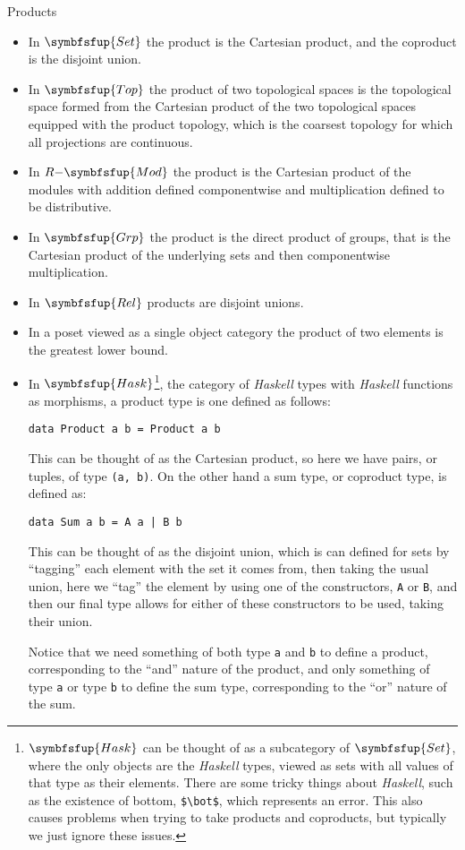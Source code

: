 \documentclass[fleqn]{NotesClass}
\makeatletter
\newcommand{\Haskell}{\textit{Haskell}}
\newcommand{\c@egory}[1]{\symbfsfup{#1}}
\newcommand{\Set}{\c@egory{Set}}
\newcommand{\Rel}{\c@egory{Rel}}
\newcommand{\Grp}{\c@egory{Grp}}
\newcommand{\RMod}[1][R]{#1{-}\c@egory{Mod}}
\newcommand{\Top}{\c@egory{Top}}
\newcommand{\Hask}{\c@egory{Hask}}
\makeatother
\begin{document}
    \begin{exm}{Products}{}
        \begin{itemize}
            \item In \(\Set\) the product is the Cartesian product, and the coproduct is the disjoint union.
            \item In \(\Top\) the product of two topological spaces is the topological space formed from the Cartesian product of the two topological spaces equipped with the product topology, which is the coarsest topology for which all projections are continuous.
            \item In \(\RMod\) the product is the Cartesian product of the modules with addition defined componentwise and multiplication defined to be distributive.
            \item In \(\Grp\) the product is the direct product of groups, that is the Cartesian product of the underlying sets and then componentwise multiplication.
            \item In \(\Rel\) products are disjoint unions.
            \item In a poset viewed as a single object category the product of two elements is the greatest lower bound.
            \item In \(\Hask\)\footnote{\(\Hask\) can be thought of as a subcategory of \(\Set\), where the only objects are the \Haskell{} types, viewed as sets with all values of that type as their elements. There are some tricky things about \Haskell{}, such as the existence of bottom, \lstinline[mathescape]|$\bot$|, which represents an error. This also causes problems when trying to take products and coproducts, but typically we just ignore these issues.}, the category of \Haskell{} types with \Haskell{} functions as morphisms, a product type is one defined as follows:
            \begin{lstlisting}[gobble=16, style=haskell]
                data Product a b = Product a b
            \end{lstlisting}
            This can be thought of as the Cartesian product, so here we have pairs, or tuples, of type \lstinline|(a, b)|.
            On the other hand a sum type, or coproduct type, is defined as:
            \begin{lstlisting}[gobble=16, style=haskell]
                data Sum a b = A a | B b
            \end{lstlisting}
            This can be thought of as the disjoint union, which is can defined for sets by \enquote{tagging} each element with the set it comes from, then taking the usual union, here we \enquote{tag} the element by using one of the constructors, \lstinline|A| or \lstinline|B|, and then our final type allows for either of these constructors to be used, taking their union.
            
            Notice that we need something of both type \lstinline|a| and \lstinline|b| to define a product, corresponding to the \enquote{and} nature of the product, and only something of type \lstinline|a| or type \lstinline|b| to define the sum type, corresponding to the \enquote{or} nature of the sum.
        \end{itemize}
    \end{exm}
    
\end{document}

